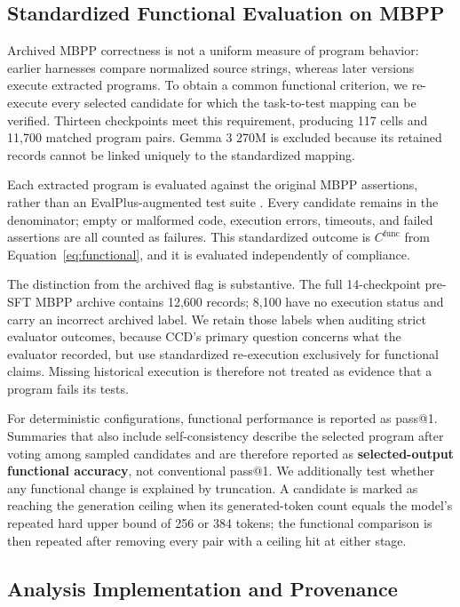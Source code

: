 \documentclass{article}
\begin{document}
\subsection{Standardized Functional Evaluation on MBPP}
\label{sec:mbpp_design}

Archived MBPP correctness is not a uniform measure of program behavior: earlier harnesses compare normalized source strings, whereas later versions execute extracted programs. To obtain a common functional criterion, we re-execute every selected candidate for which the task-to-test mapping can be verified. Thirteen checkpoints meet this requirement, producing 117 cells and 11,700 matched program pairs. Gemma 3 270M is excluded because its retained records cannot be linked uniquely to the standardized mapping.

Each extracted program is evaluated against the original MBPP assertions, rather than an EvalPlus-augmented test suite \citep{liu2023evalplus}. Every candidate remains in the denominator; empty or malformed code, execution errors, timeouts, and failed assertions are all counted as failures. This standardized outcome is \(C^{\mathrm{func}}\) from Equation~\eqref{eq:functional}, and it is evaluated independently of compliance.

The distinction from the archived flag is substantive. The full 14-checkpoint pre-SFT MBPP archive contains 12,600 records; 8,100 have no execution status and carry an incorrect archived label. We retain those labels when auditing strict evaluator outcomes, because CCD's primary question concerns what the evaluator recorded, but use standardized re-execution exclusively for functional claims. Missing historical execution is therefore not treated as evidence that a program fails its tests.

For deterministic configurations, functional performance is reported as pass@1. Summaries that also include self-consistency describe the selected program after voting among sampled candidates and are therefore reported as \textbf{selected-output functional accuracy}, not conventional pass@1. We additionally test whether any functional change is explained by truncation. A candidate is marked as reaching the generation ceiling when its generated-token count equals the model's repeated hard upper bound of 256 or 384 tokens; the functional comparison is then repeated after removing every pair with a ceiling hit at either stage.

\subsection{Analysis Implementation and Provenance}
\end{document}
